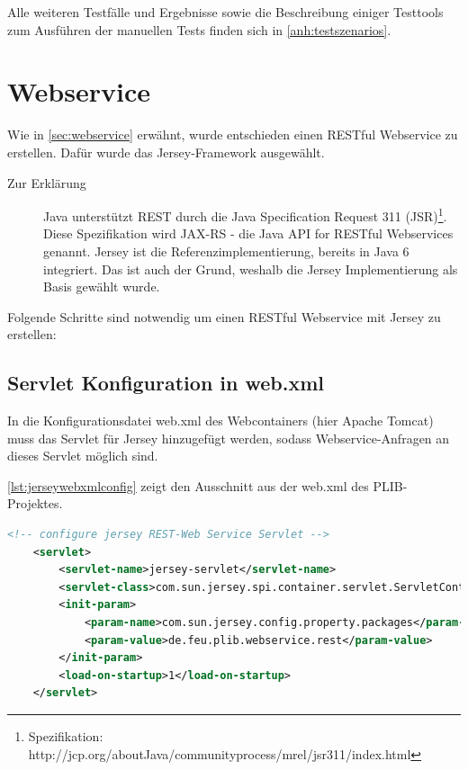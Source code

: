 Alle weiteren Testfälle und Ergebnisse sowie die Beschreibung einiger Testtools zum Ausführen der manuellen Tests finden sich in \autoref{anh:testszenarios}.

\section{Webservice}\label{kap:webservice}

Wie in \autoref{sec:webservice} erwähnt, wurde entschieden einen \gls{REST}ful \gls{Webservice} zu erstellen. Dafür wurde das \gls{Jersey}-Framework ausgewählt. 

\begin{description}
\item[Zur Erklärung] Java unterstützt REST durch die Java Specification Request 311 (JSR)\footnote{Spezifikation: http://jcp.org/aboutJava/communityprocess/mrel/jsr311/index.html}. Diese Spezifikation wird JAX-RS - die Java API for RESTful Webservices genannt. Jersey ist die Referenzimplementierung, bereits in Java 6 integriert. Das ist auch der Grund, weshalb die Jersey Implementierung als Basis gewählt wurde.  
\end{description}

Folgende Schritte sind notwendig um einen \gls{REST}ful Webservice mit Jersey zu erstellen: 

\subsection{Servlet Konfiguration in web.xml} 

In die Konfigurationsdatei web.xml des Webcontainers (hier \gls{Apache Tomcat}) muss das \gls{Servlet} für \gls{Jersey} hinzugefügt werden, sodass \gls{Webservice}-Anfragen an dieses \gls{Servlet} möglich sind. 

\autoref{lst:jerseywebxmlconfig} zeigt den Ausschnitt aus der web.xml des \gls{PLIB}-Projektes. 

 \begin{lstlisting}[caption=Jersey Servlet Konfiguration in web.xml, language=XML, label=lst:jerseywebxmlconfig]
 <!-- configure jersey REST-Web Service Servlet -->
    <servlet>
        <servlet-name>jersey-servlet</servlet-name>
        <servlet-class>com.sun.jersey.spi.container.servlet.ServletContainer</servlet-class>
        <init-param>
            <param-name>com.sun.jersey.config.property.packages</param-name>
            <param-value>de.feu.plib.webservice.rest</param-value>
        </init-param>
        <load-on-startup>1</load-on-startup>
    </servlet>
 \end{lstlisting}   
 
